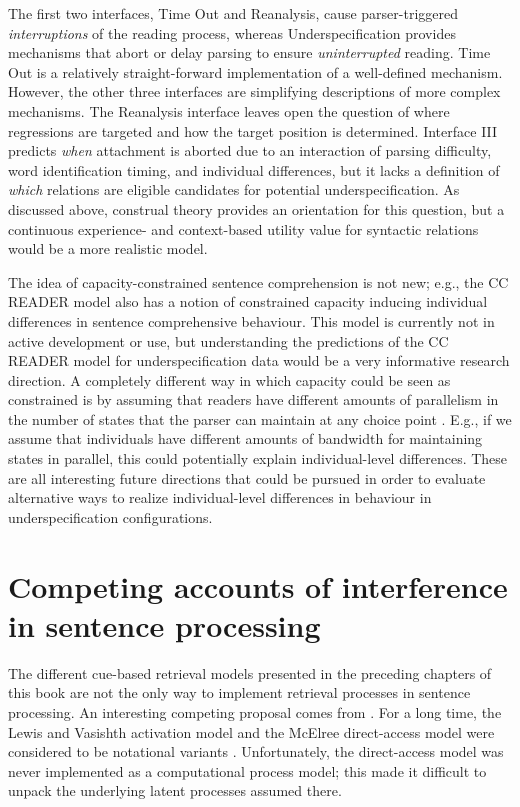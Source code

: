 \documentclass{cambridge7A}\usepackage[]{graphicx}\usepackage[]{color}
\begin{document}
The first two interfaces, Time Out and Reanalysis, cause parser-triggered \emph{interruptions} of the reading process, whereas Underspecification provides mechanisms that abort or delay parsing to ensure \emph{uninterrupted} reading.
Time Out is a relatively straight-forward implementation of a well-defined mechanism. However, the other three interfaces are simplifying descriptions of more complex mechanisms. The  Reanalysis interface leaves open the question of where regressions are targeted and how the target position is determined. 
Interface III predicts \emph{when} attachment is aborted due to an interaction of parsing difficulty, word identification timing, and individual differences, but it lacks a definition of \emph{which} relations are eligible candidates for potential underspecification. As discussed above, construal theory provides an orientation for this question, but a continuous experience- and context-based utility value for syntactic relations would be a more realistic model. 

The idea of capacity-constrained sentence comprehension is not new; e.g., the CC READER model \citep{just2002haw,varma2016caps} also has a notion of constrained capacity inducing individual differences in sentence comprehensive behaviour. This model  is currently not in active development or use, but understanding the predictions of the CC READER model for underspecification data would be a very informative  research direction. A completely different way in which capacity could be seen as constrained is by assuming that readers  have different amounts of  parallelism in the number of states that the parser can maintain at any choice point \citep{Jurafsky1996,BostonHaleVasishth2011}. E.g., if we assume that individuals have different amounts of bandwidth for maintaining states in parallel, this could potentially explain individual-level differences. These are all interesting future directions that could be pursued in order to evaluate alternative ways to realize individual-level differences in behaviour in underspecification configurations.


\chapter{Competing accounts of interference in sentence processing} \label{c05}

The different cue-based retrieval models presented in the preceding chapters of this book are not the only way to implement retrieval processes in sentence processing. An interesting competing proposal comes from \cite{McElree2000,McElree2006}. For a long time, the Lewis and Vasishth activation model and the McElree  direct-access model were  considered to be notational variants \citep[e.g., see][]{LewisVasishthVanDyke2006,parkervandykeshvartsman2017}. Unfortunately, the direct-access model was never implemented as a computational process model; this made it difficult to unpack the underlying latent processes assumed there.  
\end{document}
